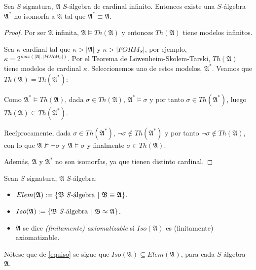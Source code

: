 \begin{theorem}\label{noiso}
Sea $S$ signatura, $\mathfrak{A}$ $S$-álgebra de cardinal infinito. Entonces existe una $S$-álgebra $\mathfrak{A}^{*}$ no isomorfa a $\mathfrak{A}$ tal que $\mathfrak{A}^{*} \equiv \mathfrak{A}$.
\end{theorem}
\begin{proof}
Por ser $\mathfrak{A}$ infinita, $\mathfrak{A} \vDash Th(\mathfrak{A})$ y entonces $Th(\mathfrak{A})$ tiene modelos infinitos. 

Sea $\kappa$ cardinal tal que $\kappa > |\mathfrak{A}|$ y $\kappa > |FORM_S|$, por ejemplo, $\kappa=2^{max(|\mathfrak{A}|,|FORM_S|)}$. Por el Teorema de Löwenheim-Skolem-Tarski, $Th(\mathfrak{A})$ tiene modelos de cardinal $\kappa$. Seleccionemos uno de estos modelos, $\mathfrak{A}^{*}$. Veamos que $Th(\mathfrak{A}) = Th(\mathfrak{A}^{*})$:

Como $\mathfrak{A}^{*} \vDash Th(\mathfrak{A})$, dada $\sigma \in Th(\mathfrak{A})$, $\mathfrak{A}^{*} \vDash \sigma$ y por tanto $\sigma \in Th(\mathfrak{A}^{*})$, luego $Th(\mathfrak{A}) \subseteq Th(\mathfrak{A}^{*})$.

Recíprocamente, dada $\sigma \in Th(\mathfrak{A}^{*})$, $\neg \sigma \notin Th(\mathfrak{A}^{*})$ y por tanto $\neg \sigma \notin Th(\mathfrak{A})$, con lo que $\mathfrak{A} \nvDash \neg \sigma$ y $\mathfrak{A} \vDash \sigma$ y finalmente $\sigma \in Th(\mathfrak{A})$.

Además, $\mathfrak{A}$ y $\mathfrak{A}^{*}$ no son isomorfas, ya que tienen distinto cardinal.
\end{proof}


\begin{defs}
Sean $S$ signatura, $\mathfrak{A}$ $S$-álgebra:
\mbox{}
\begin{itemize}
    \item $Elem(\mathfrak{A}) := \{\mathfrak{B} \text{ \textit{S}-álgebra} \, \, | \, \,  \mathfrak{B} \equiv \mathfrak{A}\}$.
    \item $Iso(\mathfrak{A}) := \{\mathfrak{B} \text{ \textit{S}-álgebra} \, \, | \, \,  \mathfrak{B} \approx \mathfrak{A}\}$.
    \item $\mathfrak{A}$ se dice \textit{(finitamente) axiomatizable} si $Iso(\mathfrak{A})$ es (finitamente) axiomatizable. 
\end{itemize}
\end{defs}

Nótese que de \ref{equiso} se sigue que $Iso(\mathfrak{A}) \subseteq Elem(\mathfrak{A})$, para cada $S$-álgebra $\mathfrak{A}$.

